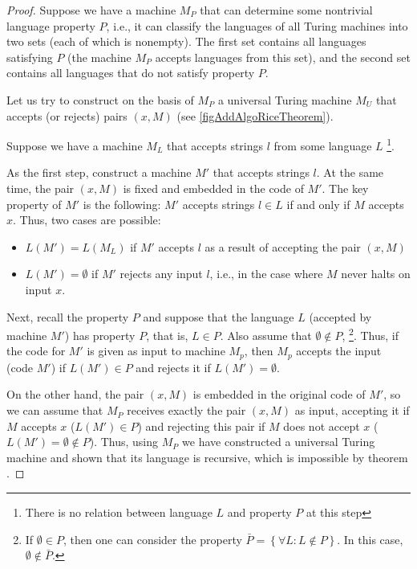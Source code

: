 \begin{proof}
Suppose we have a machine $M_P$ that can determine
some nontrivial language property $P$, i.e., it can
classify the languages of all 
Turing machines into two sets (each of which is nonempty). 
The first set contains all languages satisfying $P$ (the machine $M_P$
accepts languages from this set), and the second set contains all languages that do not
satisfy property $P$. 



Let us try to construct on the basis of $M_P$ a universal Turing machine $M_U$
that accepts (or rejects) pairs $\left(x, M\right)$ 
(see \autoref{figAddAlgoRiceTheorem}).

Suppose we have a machine $M_L$ that accepts strings $l$ from
some language $L$
\footnote{There is no relation between language $L$ and property $P$ at this step}.

As the first step, construct a machine $M'$ that accepts strings
$l$. At the same time, the pair $\left(x, M\right)$ is fixed and embedded in the code of $M'$. The key property of $M'$ is the following: $M'$ accepts strings $l \in L$ if and only if $M$ accepts $x$. Thus, two cases are possible:
\begin{itemize}
\item $L(M') = L(M_L)$ if $M'$ accepts $l$ as a result of accepting
  the pair $\left(x, M\right)$ 
\item $L(M') = \emptyset$ if $M'$ rejects any input
  $l$,
i.e., in the case where $M$ never halts on input $x$. 
\end{itemize}

Next, recall the property $P$ and suppose that the language $L$
(accepted by machine $M'$) has property $P$, that is, $L \in P$. Also assume that $\emptyset \notin P$,
\footnote{
If $\emptyset \in P$, then one can consider the property
$\bar{P} = \left\{\forall L: L \notin P\right\}$. In this case,
$\emptyset \notin \bar{P}$.
}. 
Thus, if the code for $M'$ is given as input to machine $M_p$, then $M_p$ accepts the input (code $M'$) if $L(M') \in P$ and rejects it if $L(M') = \emptyset$.

On the other hand, the pair $\left(x, M\right)$ is embedded in the original code of $M'$, so we can assume that $M_P$ receives exactly the pair 
$\left(x, M\right)$ as input, accepting it if $M$ accepts $x$
($L\left(M'\right) \in P$) and rejecting
this pair if $M$ does not accept $x$ 
($L\left(M'\right) = \emptyset \notin P$). Thus, using
$M_P$ we have constructed a universal Turing machine and shown that its
language is recursive, which is impossible by theorem 
.
\end{proof}